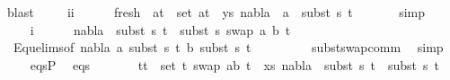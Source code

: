 \begin{isabellebody}
\ blast\isanewline
\ \ \ \isamarkupfalse%
\ ii\ \isanewline
\ \ \ \isamarkupfalse%
\ fresh{\isacharcolon}{\kern0pt}\ {\isachardoublequoteopen}{\isasymforall}\ {\isacharparenleft}{\kern0pt}a{\isacharcomma}{\kern0pt}t{\isacharparenright}{\kern0pt}\ {\isasymin}\ set\ {\isacharparenleft}{\kern0pt}{\isacharparenleft}{\kern0pt}a{\isacharcomma}{\kern0pt}t{}{\isacharparenright}{\kern0pt}\ {\isacharhash}{\kern0pt}\ ys{\isacharparenright}{\kern0pt}{\isachardot}{\kern0pt}\ nabla{}\ {\isasymturnstile}\ a\ {\isasymsharp}\ subst\ s{}\ t{\isachardoublequoteclose}\isanewline
\ \ \ \ \ \isamarkupfalse%
\ simp\isanewline
\ \ \ \isanewline
\ \ \ \isamarkupfalse%
\ i\ {}\isanewline
\ \ \ \isamarkupfalse%
\ {\isachardoublequoteopen}nabla{}\ {\isasymturnstile}\ subst\ s{}\ t{}\ {\isasymapprox}\ subst\ s{}\ {\isacharparenleft}{\kern0pt}swap\ {\isacharbrackleft}{\kern0pt}{\isacharparenleft}{\kern0pt}a{\isacharcomma}{\kern0pt}\ b{\isacharparenright}{\kern0pt}{\isacharbrackright}{\kern0pt}\ t{}{\isacharparenright}{\kern0pt}{\isachardoublequoteclose}\ \isanewline
\ \ \ \ \ \isamarkupfalse%
\ {}\ Equ{\isacharunderscore}{\kern0pt}elims{\isacharparenleft}{\kern0pt}{}{\isacharparenright}{\kern0pt}{\isacharbrackleft}{\kern0pt}of\ nabla{}\ a\ {\isacartoucheopen}subst\ s{}\ t{}{\isacartoucheclose}\ b\ {\isacartoucheopen}subst\ s{}\ t{}{\isacartoucheclose}{\isacharbrackright}{\kern0pt}\ \ \isanewline
\ \ \ \ \ \ \ subst{\isacharunderscore}{\kern0pt}swap{\isacharunderscore}{\kern0pt}comm\ \isamarkupfalse%
\ simp\isanewline
\ \ \ \isamarkupfalse%
\ eqsP{}\ \isamarkupfalse%
\ eqs{\isacharcolon}{\kern0pt}\ \isanewline
\ \ \ \ \ {\isachardoublequoteopen}{\isasymforall}\ {\isacharparenleft}{\kern0pt}t{}{\isacharcomma}{\kern0pt}t{}{\isacharparenright}{\kern0pt}\ {\isasymin}\ set\ {\isacharparenleft}{\kern0pt}{\isacharparenleft}{\kern0pt}t{}{\isacharcomma}{\kern0pt}\ swap\ {\isacharbrackleft}{\kern0pt}{\isacharparenleft}{\kern0pt}a{\isacharcomma}{\kern0pt}b{\isacharparenright}{\kern0pt}{\isacharbrackright}{\kern0pt}\ t{}{\isacharparenright}{\kern0pt}\ {\isacharhash}{\kern0pt}\ xs{\isacharparenright}{\kern0pt}{\isachardot}{\kern0pt}\ nabla{}\ {\isasymturnstile}\ subst\ s{}\ t{}\ {\isasymapprox}\ subst\ s{}\ t{}{\isachardoublequoteclose}\isanewline

\end{isabellebody}
